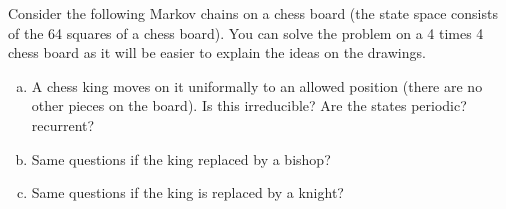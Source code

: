 \begin{problem}
	Consider the following Markov chains on a chess board (the state space consists of the 64 squares of a chess board). You can solve the problem on a 4 times 4 chess board as it will be easier to explain the ideas on the drawings.
	\begin{enumerate}[(a)]
		\item A chess king moves on it uniformally to an allowed position (there are no other pieces on the board). Is this irreducible? Are the states periodic? recurrent?
		\item Same questions if the king replaced by a bishop?
		\item Same questions if the king is replaced by a knight?
	\end{enumerate}
\end{problem}

